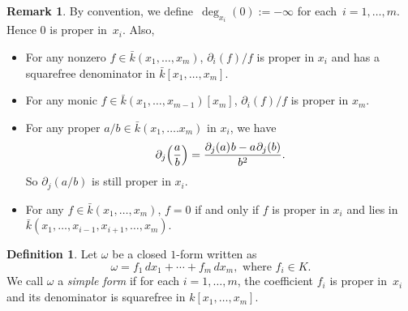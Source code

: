 \documentclass{amsart}
\theoremstyle{definition}
\newtheorem{defin}[thm]{Definition}
\newtheorem{remark}[thm]{Remark}
\numberwithin{equation}{section}
\numberwithin{thm}{section}
\begin{document}
\begin{remark}\label{RMK:proper} 
By convention, we define~$\deg_{x_i}(0) := - \infty$ for each~$i=1,\ldots,m$. Hence $0$ is proper in~$x_i$.  %
Also,
\begin{itemize}
\item For any nonzero $f \in {\bar k}(x_1,\ldots,x_m)$, $\partial_i(f)/f$ is proper in $x_i$ and has a squarefree denominator in ${\bar k}[x_1,\dots,x_m]$.
\item For any monic $f \in {\bar k}(x_1,\ldots,x_{m-1})[x_m]$, $\partial_i(f)/f$ is proper in $x_m$.
\item For any proper $a/b\in {\bar k}(x_1,\ldots.x_m)$ in $x_i$, we have 
\[\partial_j\Big(\frac{a}{b}\Big) =\frac{\partial_j(a)\hskip.5pt b - a\hskip.5pt \partial_j(b)}{b^2}. \]
So $\partial_j(a/b)$ is still proper in $x_i$. %
\item For any $f\in {\bar k}(x_1,\ldots,x_m)$,  $f =0$ if and only if $f$ is proper in $x_i$ and lies in ${\bar k}(x_1,\ldots,x_{i-1},x_{i+1},\ldots,x_m)$.
\end{itemize}
\end{remark}
%
\begin{defin}
Let $\omega$ be a closed $1$-form written as 
\[
\omega = f_1 \,dx_1+\cdots+f_m \,dx_m,
 \text{ where }f_i\in K.
\]
We call $\omega$ a \textit{simple form} if for each $i = 1, \ldots, m$, the coefficient $f_i$ is proper in~$x_i$ and its denominator is squarefree in $k[x_1,\ldots,x_m]$.
\end{defin}
\end{document}
